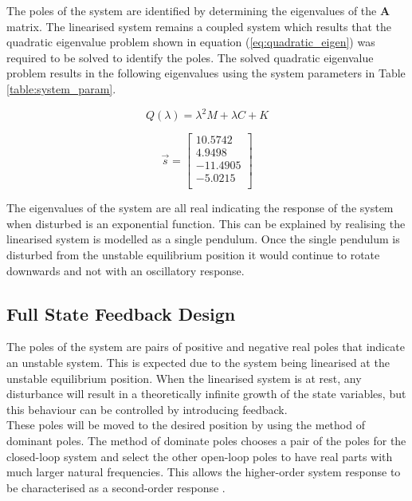 The poles of the system are identified by determining the eigenvalues of the $\boldsymbol{A}$ matrix. The linearised system remains a coupled system which results that the quadratic eigenvalue problem shown in equation (\ref{eq:quadratic_eigen}) was required to be solved to identify the poles. The solved quadratic eigenvalue problem results in the following eigenvalues using the system parameters in Table \ref{table:system_param}.

\begin{equation} \label{eq:quadratic_eigen}
Q(\lambda) =\lambda^{2}M + \lambda C + K
\end{equation}

$$
\vec{s} = 
\begin{bmatrix}
10.5742 \\
4.9498	\\
-11.4905 \\
-5.0215 \\

\end{bmatrix}
$$

The eigenvalues of the system are all real indicating the response of the system when disturbed is an exponential function. This can be explained by realising the linearised system is modelled as a single pendulum. Once the single pendulum is disturbed from the unstable equilibrium position it would continue to rotate downwards and not with an oscillatory response. 


\subsection{Full State Feedback Design}
The poles of the system are pairs of positive and negative real poles that indicate an unstable system. This is expected due to the system being linearised at the unstable equilibrium position. When the linearised system is at rest, any disturbance will result in a theoretically infinite growth of the state variables, but this behaviour can be controlled by introducing feedback. \\

These poles will be moved to the desired position by using the method of dominant poles. The method of dominate poles chooses a pair of the poles for the closed-loop system and select the other open-loop poles to have real parts with much larger natural frequencies. This allows the higher-order system response to be characterised as a second-order response \cite{textbook}. \\


